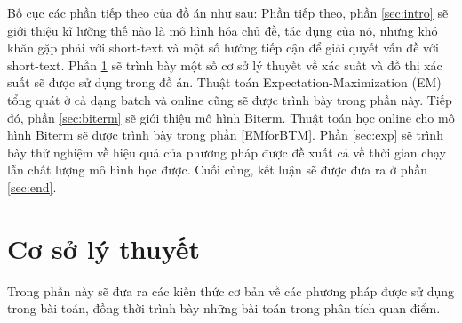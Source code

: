 \documentclass[fontsize=12pt]{scrartcl}
\begin{document}
Bố cục các phần tiếp theo của đồ án như sau: Phần tiếp theo, phần \ref{sec:intro} sẽ giới thiệu kĩ lưỡng thế nào là mô hình hóa chủ đề, tác dụng của nó, những khó khăn gặp phải với short-text và một số hướng tiếp cận để giải quyết vấn đề với short-text. Phần \ref{sec:basic} sẽ trình bày một số cơ sở lý thuyết về xác suất và đồ thị xác suất sẽ được sử dụng trong đồ án. Thuật toán Expectation-Maximization (EM) \cite{dempster1977maximum} tổng quát ở cả dạng batch và online cũng sẽ được trình bày trong phần này. Tiếp đó, phần \ref{sec:biterm} sẽ giới thiệu mô hình Biterm. Thuật toán học online cho mô hình Biterm sẽ được trình bày trong phần \ref{EMforBTM}. Phần \ref{sec:exp} sẽ trình bày thử nghiệm về hiệu quả của phương pháp được đề xuất cả về thời gian chạy lẫn chất lượng mô hình học được. Cuối cùng, kết luận sẽ được đưa ra ở phần \ref{sec:end}.
\newpage

\section{Cơ sở lý thuyết}\label{sec:basic}
Trong phần này sẽ đưa ra các kiến thức cơ bản về các phương pháp được sử dụng trong bài toán, đồng thời trình bày những bài toán trong phân tích quan điểm.
\end{document}
